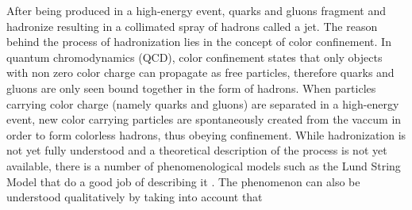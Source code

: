 \documentclass[main]{subfiles} %
\begin{document}


\doublespacing



After being produced in a high-energy event, quarks and gluons fragment and hadronize resulting in a collimated spray of hadrons called a jet. The reason behind the process of hadronization lies in the concept of color confinement. In quantum chromodynamics (QCD), color confinement states that only objects with non zero color charge can propagate as free particles, therefore quarks and gluons are only seen bound together in the form of hadrons. When particles carrying color charge (namely quarks and gluons) are separated in a high-energy event, new color carrying particles are spontaneously created from the vaccum in order to form colorless hadrons, thus obeying confinement. While hadronization is not yet fully understood and a theoretical description of the process is not yet available, there is a number of phenomenological models such as the Lund String Model that do a good job of describing it \cite{Andersson1983}. The phenomenon can also be understood qualitatively by taking into account that

























\biblio
\end{document}
